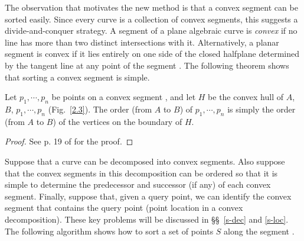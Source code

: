 The observation that motivates the new method is that 
a convex segment can be sorted easily.
Since every curve is a collection of convex segments,
this suggests a divide-and-conquer strategy.
A segment of a plane algebraic curve is {\em convex} if no line has more than 
two distinct intersections with it.
Alternatively, a planar segment is convex if it lies entirely on one side of
the closed halfplane determined by the tangent line at any point of
the segment \cite{Do}.
The following theorem shows that sorting a convex segment is simple.

\begin{theorem}
\label{T-s}
Let $p_{1},\cdots,p_{n}$ be points on a convex segment , 
and let $H$ 
be the convex hull of $A$, $B$, $p_{1},\cdots,p_{n}$ {\rm (}Fig.~{\rm \ref{2.3})}.
The order {\rm (}from $A$ to $B${\rm )} of $p_{1},\cdots,p_{n}$ is simply 
the order {\rm (}from $A$ to $B${\rm )} of the vertices on the boundary of $H$.
\end{theorem}

\begin{proof}
See p. 19 of \cite{jj} for the proof.
\end{proof}

\vspace{.2in}


Suppose that a curve can be decomposed into convex segments.
Also suppose that the convex segments in this decomposition can be ordered
so that it is simple to determine the predecessor and successor (if any) of each
convex segment.
Finally, suppose that, given a query point, 
we can identify the convex segment 
that contains the query point (point location in a convex decomposition).
These key problems will be discussed in 
\S\S~\ref{s-dec} and \ref{s-loc}.
The following algorithm shows how to sort a set of points $S$ 
along the segment .

\vspace{.2in}

